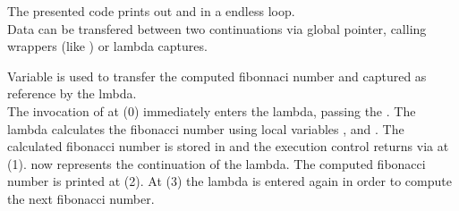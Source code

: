 The presented code prints out  and  in a endless loop.\\

Data can be transfered between two continuations via global pointer, calling
wrappers (like ) or lambda captures.

Variable  is used to transfer the computed fibonnaci number and captured
as reference by the lmbda.\\
The invocation of \callcc at (0) immediately enters the lambda, passing the
\currcont. The lambda calculates the fibonacci number using local variables
,  and . The calculated fibonacci number is stored in
 and the execution control returns via \resume at (1).
 now represents the continuation of the lambda. The computed fibonacci
number is printed at (2). At (3) the lambda is entered again in order to compute
the next fibonacci number.
